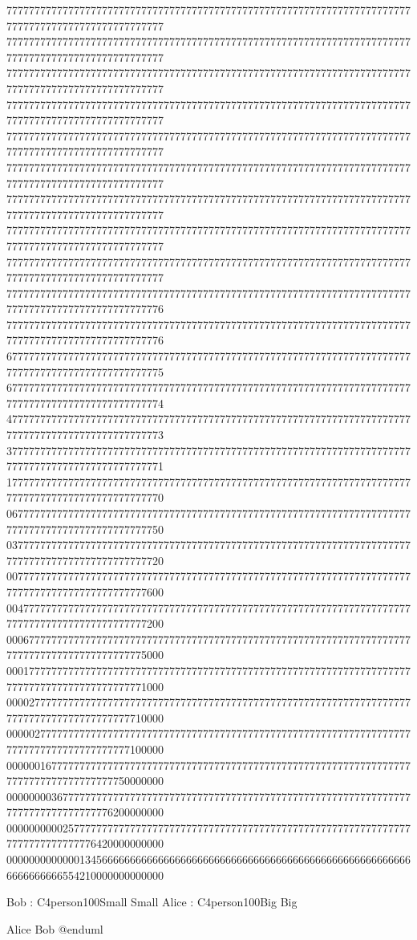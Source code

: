 \documentclass[letterpaper,10pt,english]{sphinxmanual}
\begin{document}
\begin{sphinxVerbatim}[commandchars=\\\{\},numbers=left,firstnumber=1,stepnumber=1]
7777777777777777777777777777777777777777777777777777777777777777777777777777777777777777777777777777
7777777777777777777777777777777777777777777777777777777777777777777777777777777777777777777777777777
7777777777777777777777777777777777777777777777777777777777777777777777777777777777777777777777777777
7777777777777777777777777777777777777777777777777777777777777777777777777777777777777777777777777777
7777777777777777777777777777777777777777777777777777777777777777777777777777777777777777777777777777
7777777777777777777777777777777777777777777777777777777777777777777777777777777777777777777777777777
7777777777777777777777777777777777777777777777777777777777777777777777777777777777777777777777777777
7777777777777777777777777777777777777777777777777777777777777777777777777777777777777777777777777777
7777777777777777777777777777777777777777777777777777777777777777777777777777777777777777777777777777
7777777777777777777777777777777777777777777777777777777777777777777777777777777777777777777777777776
7777777777777777777777777777777777777777777777777777777777777777777777777777777777777777777777777776
6777777777777777777777777777777777777777777777777777777777777777777777777777777777777777777777777775
6777777777777777777777777777777777777777777777777777777777777777777777777777777777777777777777777774
4777777777777777777777777777777777777777777777777777777777777777777777777777777777777777777777777773
3777777777777777777777777777777777777777777777777777777777777777777777777777777777777777777777777771
1777777777777777777777777777777777777777777777777777777777777777777777777777777777777777777777777770
0677777777777777777777777777777777777777777777777777777777777777777777777777777777777777777777777750
0377777777777777777777777777777777777777777777777777777777777777777777777777777777777777777777777720
0077777777777777777777777777777777777777777777777777777777777777777777777777777777777777777777777600
0047777777777777777777777777777777777777777777777777777777777777777777777777777777777777777777777200
0006777777777777777777777777777777777777777777777777777777777777777777777777777777777777777777775000
0001777777777777777777777777777777777777777777777777777777777777777777777777777777777777777777771000
0000277777777777777777777777777777777777777777777777777777777777777777777777777777777777777777710000
0000027777777777777777777777777777777777777777777777777777777777777777777777777777777777777777100000
0000001677777777777777777777777777777777777777777777777777777777777777777777777777777777777750000000
0000000036777777777777777777777777777777777777777777777777777777777777777777777777777777776200000000
0000000000257777777777777777777777777777777777777777777777777777777777777777777777777776420000000000
0000000000000134566666666666666666666666666666666666666666666666666666666666666666554210000000000000
\PYGZcb{}


Bob : \PYGZlt{}\PYGZdl{}C4person100Small\PYGZgt{} Small
Alice : \PYGZlt{}\PYGZdl{}C4person100Big\PYGZgt{} Big

Alice \PYGZhy{}\PYGZgt{} Bob 
@enduml

\end{sphinxVerbatim}
\end{document}
